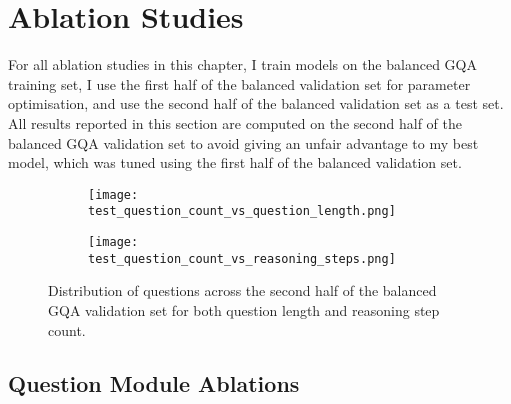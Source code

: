 \section{Ablation Studies}
\label{sec:ablation_studies}

For all ablation studies in this chapter, I train models on the balanced GQA training set, I use the first half of the balanced validation set for parameter optimisation, and use the second half of the balanced validation set as a test set. All results reported in this section are computed on the second half of the balanced GQA validation set to avoid giving an unfair advantage to my best model, which was tuned using the first half of the balanced validation set.

\begin{figure}[htbp]
    \centering
    \begin{subfigure}[l]{0.5\textwidth}
        \texttt{[image: test\_question\_count\_vs\_question\_length.png]}
        \label{fig:test_question_length_distribution}
    \end{subfigure}
    \begin{subfigure}[r]{0.49\textwidth}
        \texttt{[image: test\_question\_count\_vs\_reasoning\_steps.png]}
        \label{fig:test_reasoning_step_distribution}
    \end{subfigure}
    \caption{Distribution of questions across the second half of the balanced GQA validation set for both question length and reasoning step count.}
    \label{fig:test_reasoning_step_and_question_length_distribution}
\end{figure}



\subsection{Question Module Ablations}
\label{subsec:question_module_ablations}


